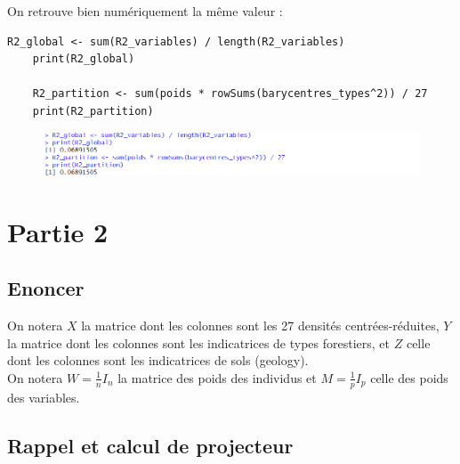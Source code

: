\documentclass{article}
\begin{document}
On retrouve bien numériquement la même valeur :
\\
\begin{lstlisting}[caption=Extrait du code R, label= Question 1b]
    R2_global <- sum(R2_variables) / length(R2_variables)
    print(R2_global)
    
    R2_partition <- sum(poids * rowSums(barycentres_types^2)) / 27
    print(R2_partition)
\end{lstlisting}

\begin{figure}[H]
    \centering
    \includegraphics[width=1.5\textwidth]{preuve_info_p1.png}
\end{figure}


\newpage
\section{Partie 2}
\subsection{Enoncer}
On notera $X$ la matrice dont les colonnes sont les 27 densités centrées-réduites, $Y$ la
matrice dont les colonnes sont les indicatrices de types forestiers, et $Z$ celle dont les
colonnes sont les indicatrices de sols (geology). \\
On notera $W=\frac{1}{n}I_n$ la matrice des poids des individus et $M=\frac{1}{p}I_p$
celle des poids des variables.
\subsection{Rappel et calcul de projecteur}
\end{document}
